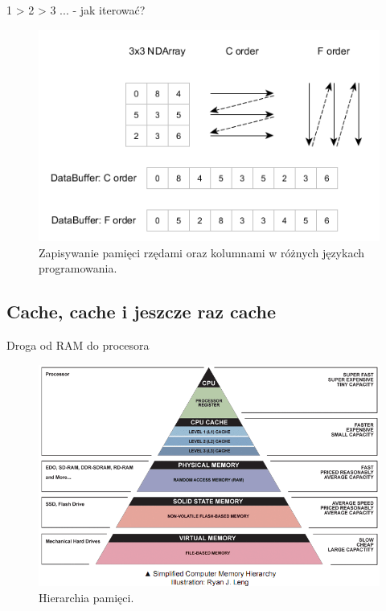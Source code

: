 \documentclass{if-beamer}
\begin{document}
\begin{frame}{1 > 2 > 3 ... - jak iterować?}

\begin{figure}
\centering
\includegraphics[scale=0.45]{rowcolwise.png}
\caption{Zapisywanie pamięci rzędami oraz kolumnami w różnych językach programowania.}
\end{figure}
  
\end{frame}

\subsection{Cache, cache i jeszcze raz cache}

\begin{frame}{Droga od RAM do procesora}

\begin{figure}
\centering
\includegraphics[scale=0.4]{memoverview.png}
\caption{Hierarchia pamięci.}
\end{figure}

\end{frame}
\end{document}
